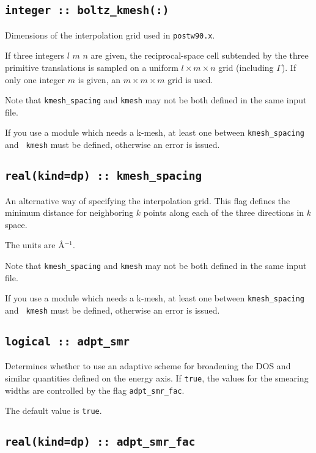   \subsection[kmesh]{\tt  integer :: boltz\_kmesh(:)}  
Dimensions of the interpolation grid used in {\tt postw90.x}.

If three integers $l$ $m$ $n$ are given, the reciprocal-space cell
subtended by the three primitive translations is sampled on a uniform
$l\times m\times n$ grid (including $\Gamma$).  If only one integer $m$ is given, an
$m\times m\times m$ grid is used.

Note that {\tt kmesh\_spacing} and {\tt kmesh} may not
be both defined in the same input file.

If you use a module which needs a k-mesh, at least one between {\tt kmesh\_spacing} and {\tt
  kmesh} must be defined, otherwise an error is issued.

  \subsection[kmesh\_spacing]{\tt real(kind=dp) :: kmesh\_spacing}
An alternative way of specifying the interpolation grid.
This flag defines the minimum distance for
neighboring $k$ points along each of the three directions in $k$
space. 

The units are \AA$^{-1}$.

Note that {\tt kmesh\_spacing} and {\tt kmesh} may
not be both defined in the same input file.

If you use a module which needs a k-mesh, at least one between {\tt kmesh\_spacing} and {\tt
  kmesh} must be defined, otherwise an error is issued.

\subsection[adpt\_smr]{\tt logical :: adpt\_smr}
Determines whether to use an adaptive scheme for broadening the
DOS and similar quantities defined on the energy axis.
If \verb#true#, the values for the smearing widths are 
controlled by the flag {\tt adpt\_smr\_fac}.

The default value is \verb#true#.

\subsection[adpt\_smr\_fac]{\tt real(kind=dp) :: adpt\_smr\_fac}

